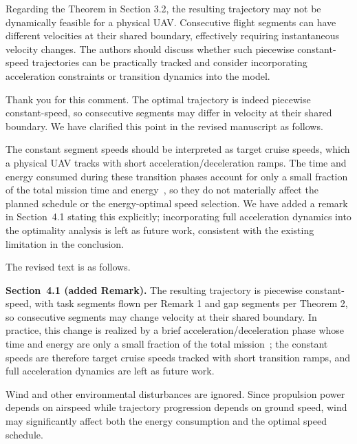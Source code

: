 \begin{revcomment}
	Regarding the Theorem in Section 3.2, the resulting trajectory may not be dynamically feasible for a physical UAV. Consecutive flight segments can have different velocities at their shared boundary, effectively requiring instantaneous velocity changes. The authors should discuss whether such piecewise constant-speed trajectories can be practically tracked and consider incorporating acceleration constraints or transition dynamics into the model.
\end{revcomment}

\begin{revresponse}[]
	Thank you for this comment. The optimal trajectory is indeed piecewise constant-speed, so consecutive segments may differ in velocity at their shared boundary. We have clarified this point in the revised manuscript as follows.

	The constant segment speeds should be interpreted as target cruise speeds, which a physical UAV tracks with short acceleration/deceleration ramps. The time and energy consumed during these transition phases account for only a small fraction of the total mission time and energy~\cite{msmo}, so they do not materially affect the planned schedule or the energy-optimal speed selection. We have added a remark in Section~4.1 stating this explicitly; incorporating full acceleration dynamics into the optimality analysis is left as future work, consistent with the existing limitation in the conclusion.

	The revised text is as follows.
	\begin{changes}
		\textbf{Section~4.1 (added Remark).} The resulting trajectory is piecewise constant-speed, with task segments flown per Remark 1 and gap segments per Theorem 2, so consecutive segments may change velocity at their shared boundary. In practice, this change is realized by a brief acceleration/deceleration phase whose time and energy are only a small fraction of the total mission~\cite{msmo}; the constant speeds are therefore target cruise speeds tracked with short transition ramps, and full acceleration dynamics are left as future work. 
    \end{changes}
\end{revresponse}

\begin{revcomment}
	Wind and other environmental disturbances are ignored. Since propulsion power depends on airspeed while trajectory progression depends on ground speed, wind may significantly affect both the energy consumption and the optimal speed schedule.
\end{revcomment}

